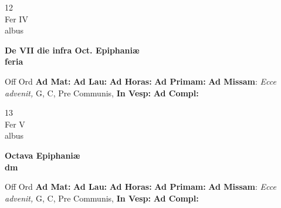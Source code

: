 \documentclass[10pt, openany]{book}
\begin{document}
        \begin{center}
            \begin{minipage}{3.5in}
                \vspace{2em}
                \begin{minipage}{0.5in}
                    {\Huge 12} \\
                    {\normalsize Fer IV} \\
                    {\normalsize albus}
                \end{minipage}
                \begin{minipage}{3.0in}
                    \textbf{ \large De VII die infra Oct. Epiphaniæ \\
                    \textnormal{\normalsize feria}} \\ 
                \end{minipage}
                \begin{justify}Off Ord
                    \textbf{Ad Mat: }
                    \textbf{Ad Lau: }
                    \textbf{Ad Horas: }
                    \textbf{Ad Primam: }\textbf{Ad Missam}: \textit{Ecce advenit,} G, C, Pre Communis,  
                    \textbf{In Vesp: }
                    \textbf{Ad Compl: }
                \end{justify}
            \end{minipage}
        \end{center}
    
        \begin{center}
            \begin{minipage}{3.5in}
                \vspace{2em}
                \begin{minipage}{0.5in}
                    {\Huge 13} \\
                    {\normalsize Fer V} \\
                    {\normalsize albus}
                \end{minipage}
                \begin{minipage}{3.0in}
                    \textbf{ \large Octava Epiphaniæ \\
                    \textnormal{\normalsize dm}} \\ 
                \end{minipage}
                \begin{justify}Off Ord
                    \textbf{Ad Mat: }
                    \textbf{Ad Lau: }
                    \textbf{Ad Horas: }
                    \textbf{Ad Primam: }\textbf{Ad Missam}: \textit{Ecce advenit,} G, C, Pre Communis,  
                    \textbf{In Vesp: }
                    \textbf{Ad Compl: }
                \end{justify}
            \end{minipage}
        \end{center}
    
\end{document}
